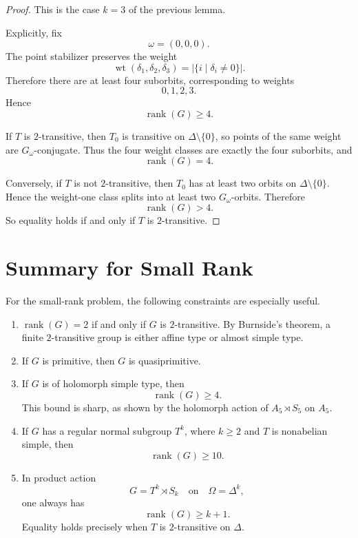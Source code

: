 \begin{proof}
This is the case \(k=3\) of the previous lemma.

Explicitly, fix
\[
\omega=(0,0,0).
\]
The point stabilizer preserves the weight
\[
\operatorname{wt}(\delta_1,\delta_2,\delta_3)
=
|\{i\mid \delta_i\neq 0\}|.
\]
Therefore there are at least four suborbits, corresponding to weights
\[
0,1,2,3.
\]
Hence
\[
\operatorname{rank}(G)\geq 4.
\]

If \(T\) is \(2\)-transitive, then \(T_0\) is transitive on
\(\Delta\setminus\{0\}\), so points of the same weight are \(G_\omega\)-conjugate.
Thus the four weight classes are exactly the four suborbits, and
\[
\operatorname{rank}(G)=4.
\]

Conversely, if \(T\) is not \(2\)-transitive, then \(T_0\) has at least two orbits on
\(\Delta\setminus\{0\}\). Hence the weight-one class splits into at least two
\(G_\omega\)-orbits. Therefore
\[
\operatorname{rank}(G)>4.
\]
So equality holds if and only if \(T\) is \(2\)-transitive.
\end{proof}

\section{Summary for Small Rank}

\begin{topic}
For the small-rank problem, the following constraints are especially useful.

\begin{enumerate}[label=\textup{(\arabic*)}]
    \item \(\operatorname{rank}(G)=2\) if and only if \(G\) is \(2\)-transitive.
    By Burnside's theorem, a finite \(2\)-transitive group is either affine type
    or almost simple type.

    \item If \(G\) is primitive, then \(G\) is quasiprimitive.

    \item If \(G\) is of holomorph simple type, then
    \[
    \operatorname{rank}(G)\geq 4.
    \]
    This bound is sharp, as shown by the holomorph action of
    \(A_5\rtimes S_5\) on \(A_5\).

    \item If \(G\) has a regular normal subgroup \(T^k\), where
    \(k\geq 2\) and \(T\) is nonabelian simple, then
    \[
    \operatorname{rank}(G)\geq 10.
    \]

    \item In product action
    \[
    G=T^k\rtimes S_k
    \quad\text{on}\quad
    \Omega=\Delta^k,
    \]
    one always has
    \[
    \operatorname{rank}(G)\geq k+1.
    \]
    Equality holds precisely when \(T\) is \(2\)-transitive on \(\Delta\).
\end{enumerate}
\end{topic}